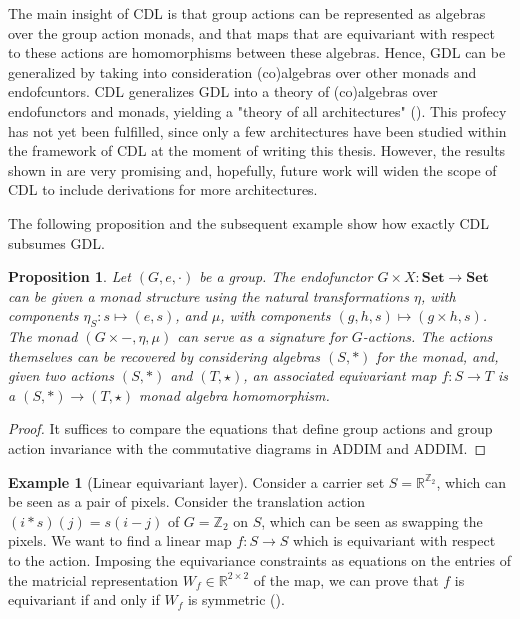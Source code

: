 \documentclass[11pt,a4paper,openright,twoside]{report}
\newcounter{mycounter}
\theoremstyle{plain}
\newtheorem{proposition}[mycounter]{Proposition}
\theoremstyle{definition}
\newtheorem{example}[mycounter]{Example}
\begin{document}
The main insight of CDL is that group actions can be represented as algebras over the group action monads, and that maps that are equivariant with respect to these actions are homomorphisms between these algebras. Hence, GDL can be generalized by taking into consideration (co)algebras over other monads and endofcuntors. CDL generalizes GDL into a theory of (co)algebras over endofunctors and monads, yielding a "theory of all architectures" (\cite{gavranovicposition}). This profecy has not yet been fulfilled, since only a few architectures have been studied within the framework of CDL at the moment of writing this thesis. However, the results shown in \cite{gavranovicposition} are very promising and, hopefully, future work will widen the scope of CDL to include derivations for more architectures.

The following proposition and the subsequent example show how exactly CDL subsumes GDL.

\begin{proposition}
  Let $(G,e,\cdot)$ be a group. The endofunctor $G \times X: \mathbf{Set} \to \mathbf{Set}$ can be given a monad structure using the natural transformations $\eta$, with components $\eta_S: s \mapsto (e,s)$, and $\mu$, with components $(g,h,s) \mapsto (g \times h, s)$. 
  The monad $(G \times -, \eta, \mu)$ can serve as a signature for $G$-actions. The actions themselves can be recovered by considering algebras $(S,\ast)$ for the monad, and, given two actions $(S,\ast)$ and $(T,\star)$, an associated equivariant map $f: S \to T$ is a $(S,\ast) \to (T,\star)$ monad algebra homomorphism.
\end{proposition}
\begin{proof}
  It suffices to compare the equations that define group actions and group action invariance with the commutative diagrams in ADDIM and ADDIM.
\end{proof}

\begin{example}[Linear equivariant layer]
  \label{ex: translationaction}
  Consider a carrier set $S = \mathbb{R}^{\mathbb{Z}_2}$, which can be seen as a pair of pixels. Consider the translation action $(i \ast s)(j) = s(i-j)$ of $G = \mathbb{Z}_2$ on $S$, which can be seen as swapping the pixels.
  We want to find a linear map $f: S \to S$ which is equivariant with respect to the action. Imposing the equivariance constraints as equations on the entries of the matricial representation $W_f \in \mathbb{R}^{2 \times 2}$ of the map, we can prove that $f$ is equivariant if and only if $W_f$ is symmetric (\cite{gavranovicposition}).
\end{example}
\end{document}
